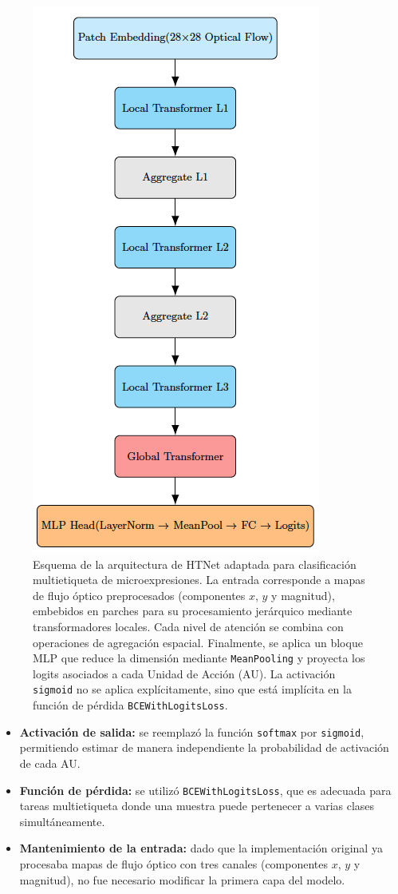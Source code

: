 \documentclass[conference]{IEEEtran}
\begin{document}
\begin{figure}[h]
\centering
\includegraphics[width=0.6\columnwidth]{figs/custom_htnet_architecture.png}
\caption{Esquema de la arquitectura de HTNet adaptada para clasificación multietiqueta de microexpresiones. La entrada corresponde a mapas de flujo óptico preprocesados (componentes $x$, $y$ y magnitud), embebidos en parches para su procesamiento jerárquico mediante transformadores locales. Cada nivel de atención se combina con operaciones de agregación espacial. Finalmente, se aplica un bloque MLP que reduce la dimensión mediante \texttt{MeanPooling} y proyecta los logits asociados a cada Unidad de Acción (AU). La activación \texttt{sigmoid} no se aplica explícitamente, sino que está implícita en la función de pérdida \texttt{BCEWithLogitsLoss}.}
\label{fig:htnet_diagrama}
\end{figure}


\begin{itemize}
    \item \textbf{Activación de salida:} se reemplazó la función \texttt{softmax} por \texttt{sigmoid}, permitiendo estimar de manera independiente la probabilidad de activación de cada AU.
    
    \item \textbf{Función de pérdida:} se utilizó \texttt{BCEWithLogitsLoss}, que es adecuada para tareas multietiqueta donde una muestra puede pertenecer a varias clases simultáneamente.
    
    \item \textbf{Mantenimiento de la entrada:} dado que la implementación original ya procesaba mapas de flujo óptico con tres canales (componentes $x$, $y$ y magnitud), no fue necesario modificar la primera capa del modelo.
\end{itemize}
\end{document}
